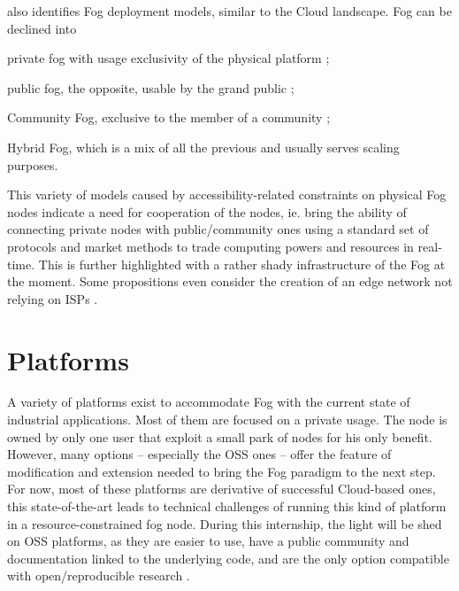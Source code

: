 \documentclass[11pt]{sdm}
\begin{document}
\citet{ahmed_fog_2019} also identifies Fog deployment models, similar to the Cloud landscape. Fog can be declined into
\begin{enumerate*}[(a)]
	\item private fog with usage exclusivity of the physical platform ;
	\item public fog, the opposite, usable by the grand public ;
	\item Community Fog, exclusive to the member of a community ;
	\item Hybrid Fog, which is a mix of all the previous and usually serves scaling purposes.
\end{enumerate*}
This variety of models caused by accessibility-related constraints on physical Fog nodes indicate a need for cooperation of the nodes, ie. bring the ability of connecting private nodes with public/community ones using a standard set of protocols and market methods to trade computing powers and resources in real-time. This is further highlighted with a rather shady infrastructure of the Fog at the moment. Some propositions even consider the creation of an edge network not relying on \glspl{ISP} \cite{bermbach_towards_2021}.

\section{Platforms}

A variety of platforms exist to accommodate Fog with the current state of industrial applications. Most of them are focused on a private usage. The node is owned by only one user that exploit a small park of nodes for his only benefit. However, many options -- especially the \gls{OSS} ones -- offer the feature of modification and extension needed to bring the Fog paradigm to the next step. For now, most of these platforms are derivative of successful Cloud-based ones, this state-of-the-art leads to technical challenges of running this kind of platform in a resource-constrained fog node.
During this internship, the light will be shed on \gls{OSS} platforms, as they are easier to use, have a public community and documentation linked to the underlying code, and are the only option compatible with open/reproducible research \cite{kjorveziroski_iot_2021}.

\end{document}
